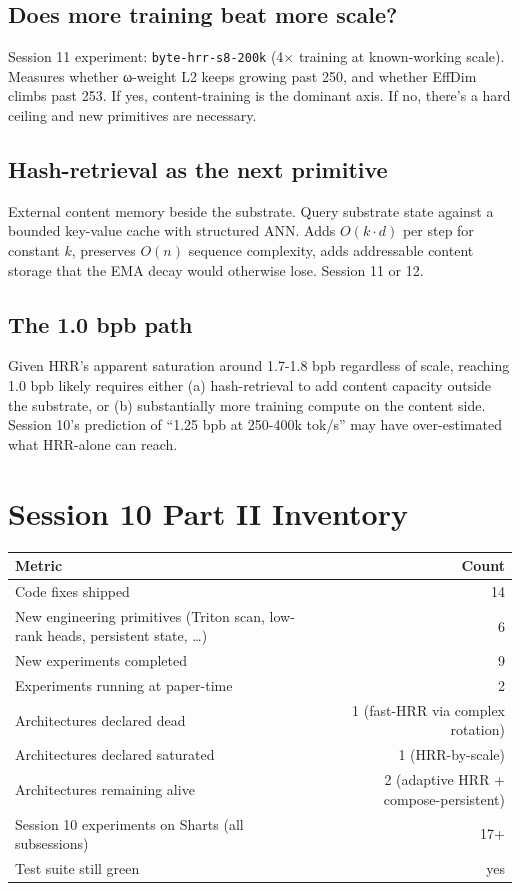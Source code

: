 \documentclass[11pt,a4paper]{report}
\begin{document}
\section{Does more training beat more scale?}
Session 11 experiment: \texttt{byte-hrr-s8-200k} (4$\times$ training at known-working scale). Measures whether ω-weight L2 keeps growing past 250, and whether EffDim climbs past 253. If yes, content-training is the dominant axis. If no, there's a hard ceiling and new primitives are necessary.

\section{Hash-retrieval as the next primitive}
External content memory beside the substrate. Query substrate state against a bounded key-value cache with structured ANN. Adds $O(k \cdot d)$ per step for constant $k$, preserves $O(n)$ sequence complexity, adds addressable content storage that the EMA decay would otherwise lose. Session 11 or 12.

\section{The 1.0 bpb path}
Given HRR's apparent saturation around 1.7-1.8 bpb regardless of scale, reaching 1.0 bpb likely requires either (a) hash-retrieval to add content capacity outside the substrate, or (b) substantially more training compute on the content side. Session 10's prediction of ``1.25 bpb at 250-400k tok/s'' may have over-estimated what HRR-alone can reach.


\chapter{Session 10 Part II Inventory}

\begin{center}
\begin{tabular}{lr}
\toprule
Metric & Count \\
\midrule
Code fixes shipped & 14 \\
New engineering primitives (Triton scan, low-rank heads, persistent state, \dots) & 6 \\
New experiments completed & 9 \\
Experiments running at paper-time & 2 \\
Architectures declared dead & 1 (fast-HRR via complex rotation) \\
Architectures declared saturated & 1 (HRR-by-scale) \\
Architectures remaining alive & 2 (adaptive HRR + compose-persistent) \\
Session 10 experiments on Sharts (all subsessions) & 17+ \\
Test suite still green & yes \\
\bottomrule
\end{tabular}
\end{center}
\end{document}
